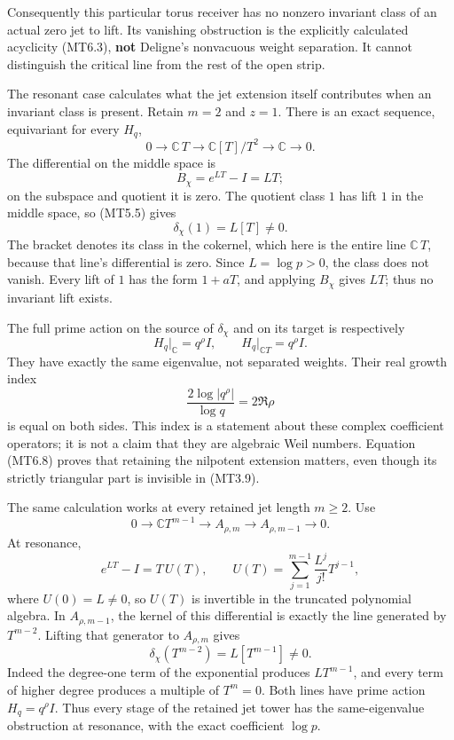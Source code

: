 Consequently this particular torus receiver has no nonzero invariant
class of an actual zero jet to lift. Its vanishing obstruction is the
explicitly calculated acyclicity (MT6.3), \textbf{not} Deligne's
nonvacuous weight separation. It cannot distinguish the critical line
from the rest of the open strip.

The resonant case calculates what the jet extension itself contributes
when an invariant class is present. Retain \(m=2\) and \(z=1\). There is
an exact sequence, equivariant for every \(H_q\), \[
 0\longrightarrow\mathbb C\,T
 \longrightarrow\mathbb C[T]/T^2
 \longrightarrow\mathbb C\longrightarrow0.
\tag{MT6.6}
\] The differential on the middle space is \[
 B_\chi=e^{LT}-I=LT;
\tag{MT6.7}
\] on the subspace and quotient it is zero. The quotient class \(1\) has
lift \(1\) in the middle space, so (MT5.5) gives \[
 \boxed{\delta_\chi(1)=L[T]\ne0.}
\tag{MT6.8}
\] The bracket denotes its class in the cokernel, which here is the
entire line \(\mathbb C\,T\), because that line's differential is zero.
Since \(L=\log p>0\), the class does not vanish. Every lift of \(1\) has
the form \(1+aT\), and applying \(B_\chi\) gives \(LT\); thus no
invariant lift exists.

The full prime action on the source of \(\delta_\chi\) and on its target
is respectively \[
 H_q\big|_{\mathbb C}=q^\rho I,\qquad
 H_q\big|_{\mathbb C T}=q^\rho I.
\tag{MT6.9}
\] They have exactly the same eigenvalue, not separated weights. Their
real growth index \[
 \frac{2\log|q^\rho|}{\log q}=2\Re\rho
\tag{MT6.10}
\] is equal on both sides. This index is a statement about these complex
coefficient operators; it is not a claim that they are algebraic Weil
numbers. Equation (MT6.8) proves that retaining the nilpotent extension
matters, even though its strictly triangular part is invisible in
(MT3.9).

The same calculation works at every retained jet length \(m\ge2\). Use
\[
 0\longrightarrow\mathbb C T^{m-1}
 \longrightarrow A_{\rho,m}
 \longrightarrow A_{\rho,m-1}\longrightarrow0.
\tag{MT6.11}
\] At resonance, \[
 e^{LT}-I=T\,U(T),\qquad
 U(T)=\sum_{j=1}^{m-1}\frac{L^j}{j!}T^{j-1},
\tag{MT6.12}
\] where \(U(0)=L\ne0\), so \(U(T)\) is invertible in the truncated
polynomial algebra. In \(A_{\rho,m-1}\), the kernel of this differential
is exactly the line generated by \(T^{m-2}\). Lifting that generator to
\(A_{\rho,m}\) gives \[
 \boxed{\delta_\chi(T^{m-2})=L[T^{m-1}]\ne0.}
\tag{MT6.13}
\] Indeed the degree-one term of the exponential produces \(LT^{m-1}\),
and every term of higher degree produces a multiple of \(T^m=0\). Both
lines have prime action \(H_q=q^\rho I\). Thus every stage of the
retained jet tower has the same-eigenvalue obstruction at resonance,
with the exact coefficient \(\log p\).

